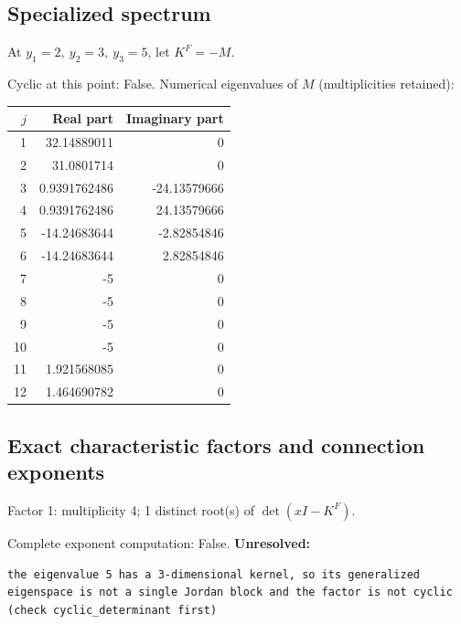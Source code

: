 \documentclass[10pt,a4paper]{article}
\newcommand{\fitmath}[1]{\sbox{\mathbox}{$\displaystyle #1$}\ifdim\wd\mathbox>\linewidth\resizebox{\linewidth}{!}{\usebox{\mathbox}}\else\usebox{\mathbox}\fi}
\begin{document}
\subsection*{Specialized spectrum}
At $y_1=2,\ y_2=3,\ y_3=5$, let $K^F=-M$.
\begin{center}\fitmath{\Delta=0}\end{center}
Cyclic at this point: False.
Numerical eigenvalues of $M$ (multiplicities retained):
\begin{center}\small\begin{tabular}{rrr}\toprule $j$ & Real part & Imaginary part\\\midrule
1 & 32.14889011 & 0\\
2 & 31.0801714 & 0\\
3 & 0.9391762486 & -24.13579666\\
4 & 0.9391762486 & 24.13579666\\
5 & -14.24683644 & -2.82854846\\
6 & -14.24683644 & 2.82854846\\
7 & -5 & 0\\
8 & -5 & 0\\
9 & -5 & 0\\
10 & -5 & 0\\
11 & 1.921568085 & 0\\
12 & 1.464690782 & 0\\
\bottomrule\end{tabular}\end{center}
\subsection*{Exact characteristic factors and connection exponents}
Factor 1: multiplicity 4; 1 distinct root(s) of $\det(xI-K^F)$.
\begin{center}\fitmath{\begin{aligned}p_{1}(x)&=x - 5\end{aligned}}\end{center}
Complete exponent computation: False.
\textbf{Unresolved:}

\begin{lstlisting}
the eigenvalue 5 has a 3-dimensional kernel, so its generalized eigenspace is not a single Jordan block and the factor is not cyclic (check cyclic_determinant first)
\end{lstlisting}
\end{document}
